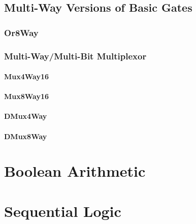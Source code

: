 \documentclass[11pt]{article}
\begin{document}
    \hypertarget{multi-way-versions-of-basic-gates}{%
\subsection{Multi-Way Versions of Basic
Gates}\label{multi-way-versions-of-basic-gates}}

    \hypertarget{or8way}{%
\subsubsection{Or8Way}\label{or8way}}

    \hypertarget{multi-waymulti-bit-multiplexor}{%
\subsubsection{Multi-Way/Multi-Bit
Multiplexor}\label{multi-waymulti-bit-multiplexor}}

    \hypertarget{mux4way16}{%
\paragraph{Mux4Way16}\label{mux4way16}}

    \hypertarget{mux8way16}{%
\paragraph{Mux8Way16}\label{mux8way16}}

    \hypertarget{dmux4way}{%
\paragraph{DMux4Way}\label{dmux4way}}

    \hypertarget{dmux8way}{%
\paragraph{DMux8Way}\label{dmux8way}}

    \hypertarget{boolean-arithmetic}{%
\section{Boolean Arithmetic}\label{boolean-arithmetic}}

    \hypertarget{sequential-logic}{%
\section{Sequential Logic}\label{sequential-logic}}
\end{document}
